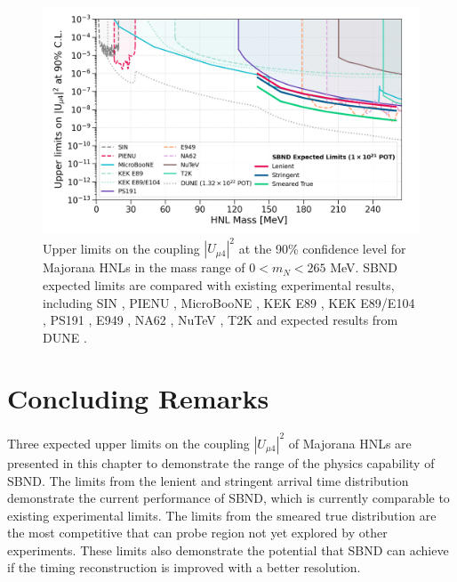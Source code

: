 \begin{figure}[b!]
    \centering
    \includegraphics[width=\textwidth]{sensitivity}
    \caption[Comparison Between SBND Expected Limits and Existing Limits]{
Upper limits on the coupling $|U_{\mu4}|^{2}$ at the 90\% confidence level for Majorana HNLs in the mass range of $0 < m_{N} < 265$ MeV.
SBND expected limits are compared with existing experimental results, including SIN \cite{SIN3}, PIENU \cite{PIENU}, MicroBooNE \cite{uboone1, uboone2, uboone3}, KEK E89 \cite{KEK2}, KEK E89/E104 \cite{KEK3}, PS191 \cite{PS191C}, E949 \cite{E949}, NA62 \cite{NA62B}, NuTeV \cite{NuTeV}, T2K \cite{t2k} and expected results from DUNE \cite{HNLSilvia}.
}
\label{fig:sensitivity}
\end{figure}

\section{Concluding Remarks}
\label{sec:result_remarks}

Three expected upper limits on the coupling $|U_{\mu4}|^2$ of Majorana HNLs are presented in this chapter to demonstrate the range of the physics capability of SBND.
The limits from the lenient and stringent arrival time distribution demonstrate the current performance of SBND, which is currently comparable to existing experimental limits.
The limits from the smeared true distribution are the most competitive that can probe region not yet explored by other experiments.
These limits also demonstrate the potential that SBND can achieve if the timing reconstruction is improved with a better resolution.

